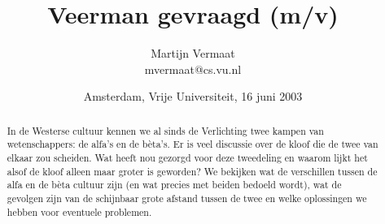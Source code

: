 \documentclass[11pt]{report}
\title{Veerman gevraagd (m/v)}
\author{
	Martijn Vermaat \\ mvermaat@cs.vu.nl
}
\date{Amsterdam, Vrije Universiteit, 16 juni 2003}
\begin{document}
\maketitle


\begin{abstract}
In de Westerse cultuur kennen we al sinds de Verlichting twee kampen van wetenschappers: de alfa's en de b\`eta's. Er is veel discussie over de kloof die de twee van elkaar zou scheiden. Wat heeft nou gezorgd voor deze tweedeling en waarom lijkt het alsof de kloof alleen maar groter is geworden? We bekijken wat de verschillen tussen de alfa en de b\`eta cultuur zijn (en wat precies met beiden bedoeld wordt), wat de gevolgen zijn van de schijnbaar grote afstand tussen de twee en welke oplossingen we hebben voor eventuele problemen.
\end{abstract}

\tableofcontents











\end{document}
